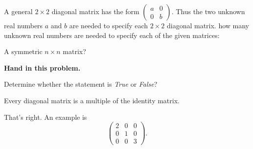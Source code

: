 \documentclass{ximera}
\begin{document}



\problemlabel

\noindent A general $2\times 2$ diagonal matrix has the form $\left(\begin{array}{rr} a & 0 \\ 0 & b\end{array}\right)$.  Thus the two unknown real numbers $a$ and $b$ are needed to specify each $2\times 2$ diagonal matrix.  how many unknown real numbers are needed to specify each of the given matrices:

\begin{exercise}  \label{c1.3.3c}
A symmetric $n\times n$ matrix?   

{\center\bf Hand in this problem.}
%
\end{exercise}





\problemlabel

\noindent Determine whether the statement is {\em True\/} or {\em False\/}?

\begin{exercise} \label{c1.3.4b}
  Every diagonal matrix is a multiple of the identity matrix.
  \begin{multipleChoice}
  \end{multipleChoice}
  \begin{feedback}[correct]
    That's right.   An example is
    \[\left(\begin{array}{ccc}
              2 & 0 & 0 \\
              0 & 1 & 0 \\
              0 & 0 & 3 \end{array}\right).\]
  \end{feedback}
  
\end{exercise}
\end{document}
